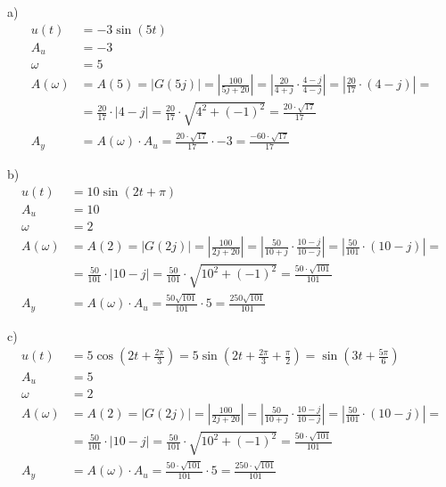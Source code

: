 \documentclass[a4paper,11pt]{article}
\begin{document}
a)
\begin{align*}
u(t) &= -3\sin{(5t)} \\
A_u &= -3 \\
\omega &= 5 \\
A(\omega) &= A(5) = |G(5j)| = \left| \frac{100}{5j+20} \right| 
= \left| \frac{20}{4+j} \cdot \frac{4-j}{4-j} \right|
= \left| \frac{20}{17} \cdot (4-j) \right| = \\
&= \frac{20}{17} \cdot |4-j| = \frac{20}{17} \cdot \sqrt{4^2+(-1)^2} 
= \frac{20 \cdot \sqrt{17}}{17} \\
A_y &= A(\omega) \cdot A_u = \frac{20 \cdot \sqrt{17}}{17} \cdot -3
= \boxed{ \frac{-60 \cdot \sqrt{17}}{17} }
\end{align*}

b)
\begin{align*}
u(t) &= 10\sin{\left( 2t+\pi \right)} \\
A_u &= 10 \\
\omega &= 2 \\
A(\omega) &= A(2) = |G(2j)| = \left| \frac{100}{2j+20} \right| 
= \left| \frac{50}{10+j} \cdot \frac{10-j}{10-j} \right|
= \left| \frac{50}{101} \cdot (10-j) \right| = \\
&= \frac{50}{101} \cdot |10-j| = \frac{50}{101} \cdot \sqrt{10^2+(-1)^2} 
= \frac{50 \cdot \sqrt{101}}{101} \\
A_y &= A(\omega) \cdot A_u = \frac{50\sqrt{101}}{101} \cdot 5
= \frac{250\sqrt{101}}{101}
\end{align*}

c)
\begin{align*}
u(t) &= 5\cos{\left( 2t+\frac{2\pi}{3} \right)} = 5\sin{\left( 2t+\frac{2\pi}{3}+\frac{\pi}{2} \right)}
= \sin{\left( 3t+\frac{5\pi}{6} \right)} \\
A_u &= 5 \\
\omega &= 2 \\
A(\omega) &= A(2) = |G(2j)| = \left| \frac{100}{2j+20} \right| 
= \left| \frac{50}{10+j} \cdot \frac{10-j}{10-j} \right|
= \left| \frac{50}{101} \cdot (10-j) \right| = \\
&= \frac{50}{101} \cdot |10-j| = \frac{50}{101} \cdot \sqrt{10^2+(-1)^2} 
= \frac{50 \cdot \sqrt{101}}{101} \\
A_y &= A(\omega) \cdot A_u = \frac{50 \cdot \sqrt{101}}{101} \cdot 5
= \boxed{ \frac{250 \cdot \sqrt{101}}{101} }
\end{align*}
\end{document}

